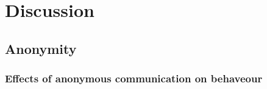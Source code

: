 
\part{Discussion}

\chapter{Anonymity}

\section{Effects of anonymous communication on behaveour}
\cite{postmes2001social}
